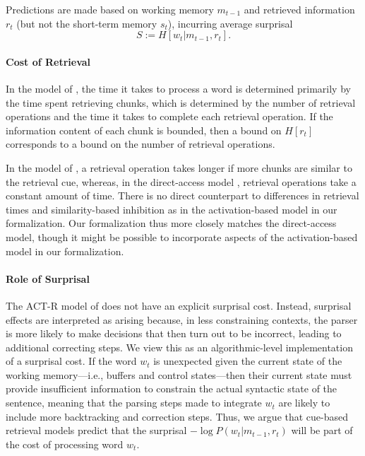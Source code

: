 \documentclass[11pt,letterpaper]{article}
\begin{document}
Predictions are made based on working memory $m_{t-1}$ and retrieved information $r_t$ (but not the short-term memory $s_t$), incurring average surprisal
\begin{equation}
    S := H[w_t| m_{t-1}, r_t].
\end{equation}


\paragraph{Cost of Retrieval}
In the model of \cite{lewis-activation-based-2005}, the time it takes to process a word is determined primarily by the time spent retrieving chunks, which is determined by the number of retrieval operations and the time it takes to complete each retrieval operation.
If the information content of each chunk is bounded, then a bound on $H[r_t]$ corresponds to a bound on the number of retrieval operations.

In the model of \cite{lewis-activation-based-2005}, a retrieval operation takes longer if more chunks are similar to the retrieval cue, whereas, in the direct-access model \citep{mcelree2000sentence,nicenboim2018models,vasishth2019computational}, retrieval operations take a constant amount of time.
There is no direct counterpart to differences in retrieval times and similarity-based inhibition as in the activation-based model in our formalization.
Our formalization thus more closely matches the direct-access model, though it might be possible to incorporate aspects of the activation-based model in our formalization.

\paragraph{Role of Surprisal}
The ACT-R model of \cite{lewis-activation-based-2005} does not have an explicit surprisal cost.
Instead, surprisal effects are interpreted as arising because, in less constraining contexts, the parser is more likely to make decisions that then turn out to be incorrect, leading to additional correcting steps.
We view this as an algorithmic-level implementation of a surprisal cost.
If the word $w_t$ is unexpected given the current state of the working memory---i.e., buffers and control states---then their current state must provide insufficient information to constrain the actual syntactic state of the sentence, meaning that the parsing steps made to integrate $w_t$ are likely to include more backtracking and correction steps.
Thus, we argue that cue-based retrieval models predict that the surprisal $- \log P(w_t|m_{t-1}, r_t)$ will be part of the cost of processing word $w_t$.
\end{document}
